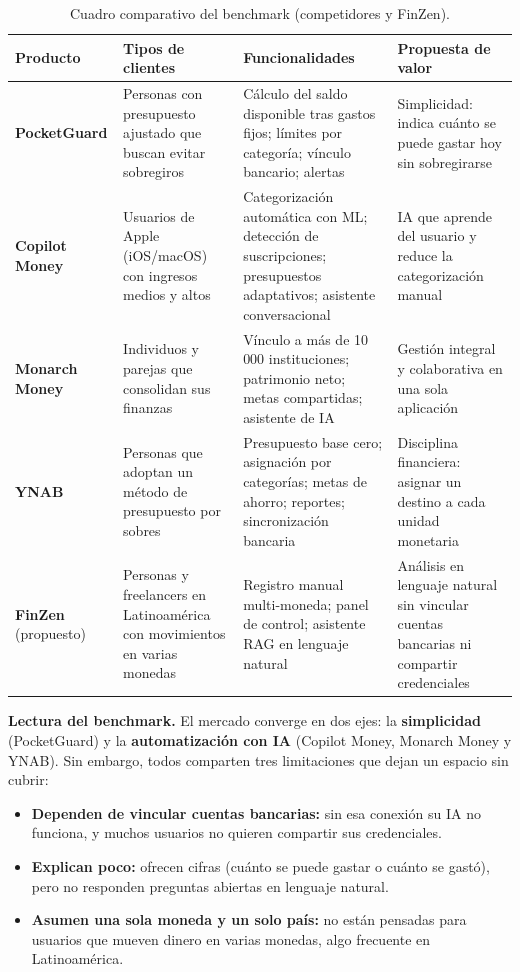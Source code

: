 \documentclass[12pt,letterpaper]{article}
\begin{document}
\begin{table}[H]
\centering
\footnotesize
\renewcommand{\arraystretch}{1.3}
\setlength{\tabcolsep}{4pt}
\begin{tabular}{>{\raggedright\arraybackslash}p{2.8cm} p{3.4cm} p{4.6cm} p{4.5cm}}
\toprule
\textbf{Producto} & \textbf{Tipos de clientes} & \textbf{Funcionalidades} & \textbf{Propuesta de valor} \\
\midrule
\textbf{PocketGuard} & Personas con presupuesto ajustado que buscan evitar sobregiros & C\'alculo del saldo disponible tras gastos fijos; l\'imites por categor\'ia; v\'inculo bancario; alertas & Simplicidad: indica cu\'anto se puede gastar hoy sin sobregirarse \\
\textbf{Copilot Money} & Usuarios de Apple (iOS/macOS) con ingresos medios y altos & Categorizaci\'on autom\'atica con ML; detecci\'on de suscripciones; presupuestos adaptativos; asistente conversacional & IA que aprende del usuario y reduce la categorizaci\'on manual \\
\textbf{Monarch Money} & Individuos y parejas que consolidan sus finanzas & V\'inculo a m\'as de 10\,000 instituciones; patrimonio neto; metas compartidas; asistente de IA & Gesti\'on integral y colaborativa en una sola aplicaci\'on \\
\textbf{YNAB} & Personas que adoptan un m\'etodo de presupuesto por sobres & Presupuesto base cero; asignaci\'on por categor\'ias; metas de ahorro; reportes; sincronizaci\'on bancaria & Disciplina financiera: asignar un destino a cada unidad monetaria \\
\midrule
\textbf{FinZen} (propuesto) & Personas y freelancers en Latinoam\'erica con movimientos en varias monedas & Registro manual multi-moneda; panel de control; asistente RAG en lenguaje natural & An\'alisis en lenguaje natural sin vincular cuentas bancarias ni compartir credenciales \\
\bottomrule
\end{tabular}
\caption{Cuadro comparativo del benchmark (competidores y FinZen).}
\end{table}

\textbf{Lectura del benchmark.} El mercado converge en dos ejes: la
\textbf{simplicidad} (PocketGuard) y la \textbf{automatizaci\'on con IA} (Copilot Money,
Monarch Money y YNAB). Sin embargo, todos comparten tres limitaciones que dejan un
espacio sin cubrir:
\begin{itemize}[leftmargin=1.2cm]
  \item \textbf{Dependen de vincular cuentas bancarias:} sin esa conexi\'on su IA no
        funciona, y muchos usuarios no quieren compartir sus credenciales.
  \item \textbf{Explican poco:} ofrecen cifras (cu\'anto se puede gastar o cu\'anto se
        gast\'o), pero no responden preguntas abiertas en lenguaje natural.
  \item \textbf{Asumen una sola moneda y un solo pa\'is:} no est\'an pensadas para
        usuarios que mueven dinero en varias monedas, algo frecuente en Latinoam\'erica.
\end{itemize}
\end{document}
